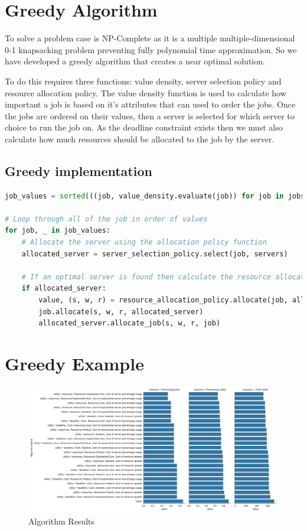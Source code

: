\documentclass[fleqn]{article}
\begin{document}
\section{Greedy Algorithm}\label{sec:greedy-algorithm}
To solve a problem case is NP-Complete as it is a multiple multiple-dimensional 0-1 knapsacking problem preventing fully polynomial time approximation.
So we have developed a greedy algorithm that creates a near optimal solution.

To do this requires three functions: value density, server selection policy and resource allocation policy.
The value density function is used to calculate how important a job is based on it's attributes that can used to order the jobs.
Once the jobs are ordered on their values, then a server is selected for which server to choice to run the job on.
As the deadline constraint exists then we must also calculate how much resources should be allocated to the job by the server.

\subsection{Greedy implementation}\label{subsec:greedy-implementation}
\begin{lstlisting}[language=Python]
job_values = sorted(((job, value_density.evaluate(job)) for job in jobs), key=lambda jv: jv[1], reverse=True)

# Loop through all of the job in order of values
for job, _ in job_values:
    # Allocate the server using the allocation policy function
    allocated_server = server_selection_policy.select(job, servers)

    # If an optimal server is found then calculate the resource allocation policy
    if allocated_server:
        value, (s, w, r) = resource_allocation_policy.allocate(job, allocated_server)
        job.allocate(s, w, r, allocated_server)
        allocated_server.allocate_job(s, w, r, job)
\end{lstlisting}

\section{Greedy Example}\label{sec:greedy-example}
\begin{figure}
    \centering
    \includegraphics[width=1\linewidth]{../results/repeat_algorithms.png}
    \caption{Algorithm Results}
\end{figure}
\end{document}
